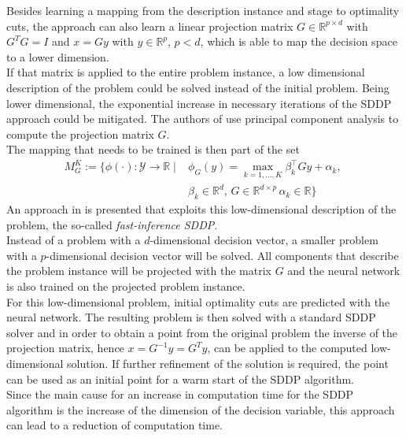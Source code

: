 Besides learning a mapping from the description instance and stage to optimality cuts, the approach can also learn a linear projection matrix $G \in \mathbb{R}^{p \times d}$ with $G^T G = \mathit{I}$ and $x = Gy$ with $y \in \mathbb{R}^{p}$, $p < d$, which is able to map the decision space to a lower dimension. \\
If that matrix is applied to the entire problem instance, a low dimensional description of the problem could be solved instead of the initial problem.
Being lower dimensional, the exponential increase in necessary iterations of the SDDP approach could be mitigated.
The authors of \cite{NSDDP} use principal component analysis to compute the projection matrix $G$. \\
The mapping that needs to be trained is then part of the set
\begin{equation}\label{Projected_Problem}
    \begin{split}
        M^{K}_G := \big\{\phi( \cdot ): \mathcal{Y} \rightarrow \mathbb{R} \; |\; & \phi_G(y) = \max_{k = 1, \dots, K} \beta^\intercal_k Gy + \alpha_k, \;  \\ 
        & \beta_k \in \mathbb{R}^d, \, G \in \mathbb{R}^{d \times p }\, \alpha_k \in \mathbb{R} \big\}
    \end{split}
\end{equation}
An approach in \cite{NSDDP} is presented that exploits this low-dimensional description of the problem, the so-called \textit{fast-inference SDDP}. \\
Instead of a problem with a $d$-dimensional decision vector, a smaller problem with a $p$-dimensional decision vector will be solved.
All components that describe the problem instance will be projected with the matrix $G$ and the neural network is also trained on the projected problem instance. \\
For this low-dimensional problem, initial optimality cuts are predicted with the neural network.
The resulting problem is then solved with a standard SDDP solver and in order to obtain a point from the original problem the inverse of the projection matrix, hence $x = G^{-1}y = G^Ty$, can be applied to the computed low-dimensional solution.
If further refinement of the solution is required, the point can be used as an initial point for a warm start of the SDDP algorithm. \\ 
Since the main cause for an increase in computation time for the SDDP algorithm is the increase of the dimension of the decision variable, this approach can lead to a reduction of computation time.


